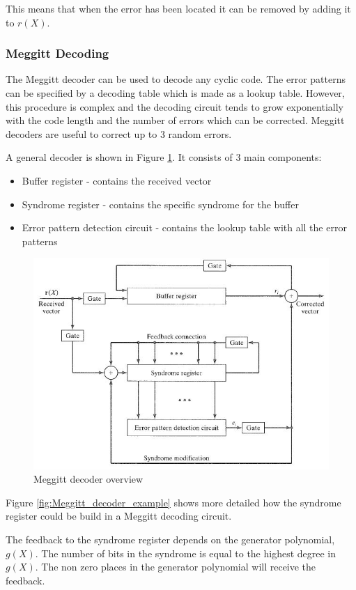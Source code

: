 \documentclass[Main]{subfiles}
\begin{document}
This means that when the error has been located it can be removed by adding it to $ r(X) $.



\subsubsection{Meggitt Decoding}\label{sec:Meggitt}
The Meggitt decoder can be used to decode any cyclic code.
The error patterns can be specified by a decoding table which is made as a lookup table.
However, this procedure is complex and the decoding circuit tends to grow exponentially with the code length and the number of errors which can be corrected.
Meggitt decoders are useful to correct up to 3 random errors.

A general decoder is shown in Figure \ref{fig:Meggitt_decoder}. 
It consists of 3 main components:

\begin{itemize} \itemsep1pt \parskip0pt 
\item Buffer register - contains the received vector
\item Syndrome register - contains the specific syndrome for the buffer
\item Error pattern detection circuit - contains the lookup table with all the error patterns
\end{itemize}

\begin{figure}[H]
\centering
\includegraphics[width=0.7\linewidth]{./Picture/Meggitt_decoder}
\caption[The Meggitt decoder]{Meggitt decoder overview}
\label{fig:Meggitt_decoder}
\end{figure}

Figure \ref{fig:Meggitt_decoder_example} shows more detailed how the syndrome register could be build in a Meggitt decoding circuit.

The feedback to the syndrome register depends on the generator polynomial, $g(X)$.
The number of bits in the syndrome is equal to the highest degree in $g(X)$.
The non zero places in the generator polynomial will receive the feedback.
\end{document}
